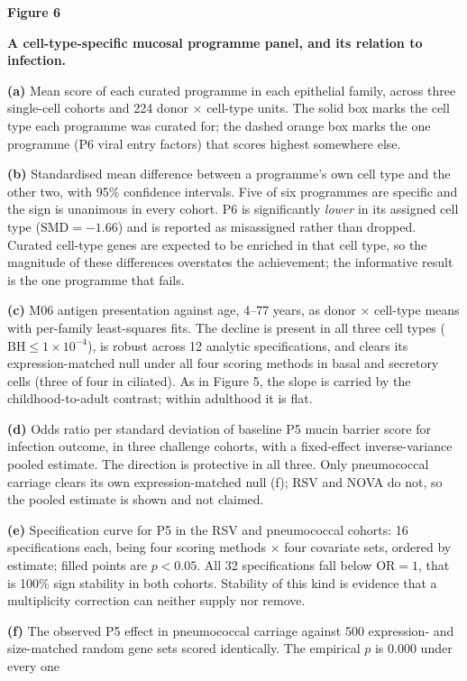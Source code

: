 \documentclass[11pt,a4paper]{article}
\newcommand{\legend}[3]{%
  \clearpage
  {\large\textbf{Figure #1}\par}
  \vspace{2pt}
  {\textbf{#2}\par}
  \vspace{6pt}
  \small #3\par
}
\begin{document}
\legend{6}{A cell-type-specific mucosal programme panel, and its relation to infection.}{%
\textbf{(a)} Mean score of each curated programme in each epithelial family, across three
single-cell cohorts and 224 donor $\times$ cell-type units. The solid box marks the cell type
each programme was curated for; the dashed orange box marks the one programme (P6 viral entry
factors) that scores highest somewhere else.
\par
\textbf{(b)} Standardised mean difference between a programme's own cell type and the other
two, with 95\% confidence intervals. Five of six programmes are specific and the sign is
unanimous in every cohort. P6 is significantly \emph{lower} in its assigned cell type
($\mathrm{SMD}=-1.66$) and is reported as misassigned rather than dropped. Curated cell-type
genes are expected to be enriched in that cell type, so the magnitude of these differences
overstates the achievement; the informative result is the one programme that fails.
\par
\textbf{(c)} M06 antigen presentation against age, 4--77 years, as donor $\times$ cell-type
means with per-family least-squares fits. The decline is present in all three cell types
($\mathrm{BH}\le1\times10^{-4}$), is robust across 12 analytic specifications, and clears its
expression-matched null under all four scoring methods in basal and secretory cells (three of
four in ciliated). As in Figure 5, the slope is carried by the childhood-to-adult contrast;
within adulthood it is flat.
\par
\textbf{(d)} Odds ratio per standard deviation of baseline P5 mucin barrier score for
infection outcome, in three challenge cohorts, with a fixed-effect inverse-variance pooled
estimate. The direction is protective in all three. Only pneumococcal carriage clears its own
expression-matched null (f); RSV and NOVA do not, so the pooled estimate is shown and not
claimed.
\par
\textbf{(e)} Specification curve for P5 in the RSV and pneumococcal cohorts: 16
specifications each, being four scoring methods $\times$ four covariate sets, ordered by
estimate; filled points are $p<0.05$. All 32 specifications fall below $\mathrm{OR}=1$, that
is 100\% sign stability in both cohorts. Stability of this kind is evidence that a
multiplicity correction can neither supply nor remove.
\par
\textbf{(f)} The observed P5 effect in pneumococcal carriage against 500 expression- and
size-matched random gene sets scored identically. The empirical $p$ is 0.000 under every one
}
\end{document}
